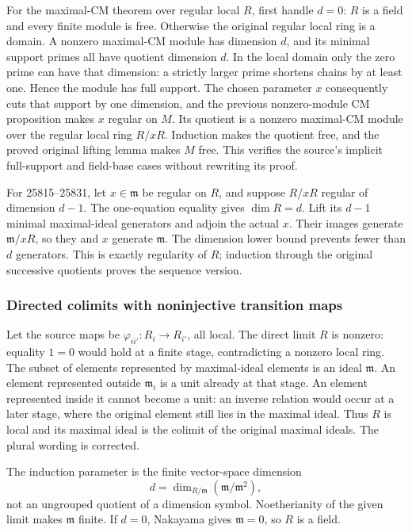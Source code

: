 For the maximal-CM theorem over regular local \(R\), first handle \(d=0\): \(R\) is a field and every finite module is free. Otherwise the original regular local ring is a domain. A nonzero maximal-CM module has dimension \(d\), and its minimal support primes all have quotient dimension \(d\). In the local domain only the zero prime can have that dimension: a strictly larger prime shortens chains by at least one. Hence the module has full support. The chosen parameter \(x\) consequently cuts that support by one dimension, and the previous nonzero-module CM proposition makes \(x\) regular on \(M\). Its quotient is a nonzero maximal-CM module over the regular local ring \(R/xR\). Induction makes the quotient free, and the proved original lifting lemma makes \(M\) free. This verifies the source's implicit full-support and field-base cases without rewriting its proof.

For 25815--25831, let \(x\in\mathfrak m\) be regular on \(R\), and suppose \(R/xR\) regular of dimension \(d-1\). The one-equation equality gives \(\dim R=d\). Lift its \(d-1\) minimal maximal-ideal generators and adjoin the actual \(x\). Their images generate \(\mathfrak m/xR\), so they and \(x\) generate \(\mathfrak m\). The dimension lower bound prevents fewer than \(d\) generators. This is exactly regularity of \(R\); induction through the original successive quotients proves the sequence version.

\subsubsection{Directed colimits with noninjective transition maps}\label{algebra-proof-020-directed-colimits-with-noninjective-transition-maps}

Let the source maps be \(\varphi_{ii'}:R_i\to R_{i'}\), all local. The direct limit \(R\) is nonzero: equality \(1=0\) would hold at a finite stage, contradicting a nonzero local ring. The subset of elements represented by maximal-ideal elements is an ideal \(\mathfrak m\). An element represented outside \(\mathfrak m_i\) is a unit already at that stage. An element represented inside it cannot become a unit: an inverse relation would occur at a later stage, where the original element still lies in the maximal ideal. Thus \(R\) is local and its maximal ideal is the colimit of the original maximal ideals. The plural wording is corrected.

The induction parameter is the finite vector-space dimension \[
 d=\dim_{R/\mathfrak m}(\mathfrak m/\mathfrak m^2),
\] not an ungrouped quotient of a dimension symbol. Noetherianity of the given limit makes \(\mathfrak m\) finite. If \(d=0\), Nakayama gives \(\mathfrak m=0\), so \(R\) is a field.

